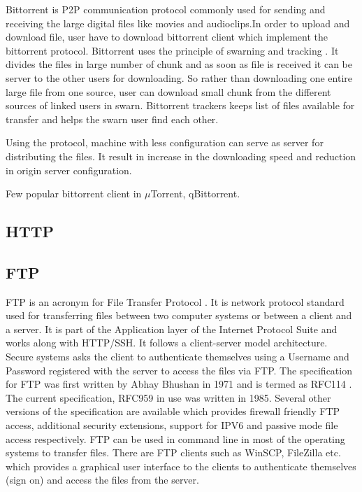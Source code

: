 {     Bittorrent is P2P communication protocol commonly used for
     sending and receiving the large digital files like movies and
     audioclips.In order to upload and download file, user have to
     download bittorrent client which implement the bittorrent
     protocol. Bittorrent uses the principle of swarning and
     tracking \cite{www-bittorrent}. It divides the files in large
     number of chunk and as soon as file is received it can be server
     to the other users for downloading.  So rather than downloading
     one entire large file from one source, user can download small
     chunk from the different sources of linked users in
     swarn. Bittorrent trackers keeps list of files available for
     transfer and helps the swarn user find each other.

     Using the protocol, machine with less configuration can serve as
     server for distributing the files. It result in increase in the
     downloading speed and reduction in origin server configuration.

     Few popular bittorrent client in $\mu$Torrent, qBittorrent.

     \pv

\subsection{HTTP}
\subsection{FTP }

     FTP is an acronym for File Transfer
     Protocol \cite{www-ftp-wiki}. It is network protocol
     standard used for transferring
     files between two computer systems or between a client and a
     server. It is part of the Application layer of the Internet
     Protocol Suite and works along with HTTP/SSH. It follows a
     client-server model architecture. Secure systems asks the client
     to authenticate themselves using a Username and Password
     registered with the server to access the files via FTP. The
     specification for FTP was first written by Abhay Bhushan
     in 1971 and is termed as RFC114 \cite{www-rfc114}. The current
     specification, RFC959 in use was written in 1985. Several other
     versions of the specification are available which provides
     firewall friendly FTP access, additional security extensions,
     support for IPV6 and passive mode file access respectively. FTP
     can be used in command line in most of the operating systems to
     transfer files. There are FTP clients such as WinSCP, FileZilla
     etc. which provides a graphical user interface to the clients to
     authenticate themselves (sign on) and access the files from the
     server.

}
